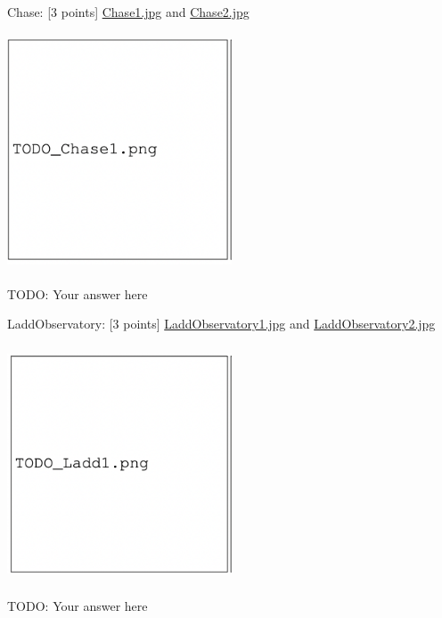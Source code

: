 \documentclass{csci1430}
\begin{document}
\pagebreak

Chase: [3 points]
\href{images/Chase1.jpg}{Chase1.jpg} and \href{images/Chase2.jpg}{Chase2.jpg}

\begin{answer}[height=22]
\includegraphics[width=0.5\textwidth,height=7cm,keepaspectratio]{images/TODO_Chase1.png}

TODO: Your answer here
\end{answer}
    
\pagebreak


LaddObservatory: [3 points]
\href{images/LaddObservatory1.jpg}{LaddObservatory1.jpg} and \href{images/LaddObservatory2.jpg}{LaddObservatory2.jpg}

\begin{answer}[height=22]
\includegraphics[width=0.5\textwidth,height=7cm,keepaspectratio]{images/TODO_Ladd1.png}

TODO: Your answer here
\end{answer}


\pagebreak
\end{document}
